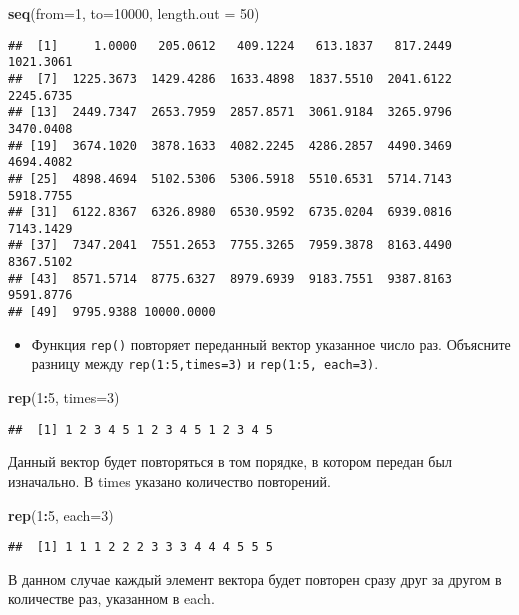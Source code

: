 \documentclass[]{article}
\newenvironment{Shaded}{\begin{snugshade}}{\end{snugshade}}
\newcommand{\KeywordTok}[1]{\textcolor[rgb]{0.13,0.29,0.53}{\textbf{#1}}}
\newcommand{\DataTypeTok}[1]{\textcolor[rgb]{0.13,0.29,0.53}{#1}}
\newcommand{\DecValTok}[1]{\textcolor[rgb]{0.00,0.00,0.81}{#1}}
\newcommand{\OperatorTok}[1]{\textcolor[rgb]{0.81,0.36,0.00}{\textbf{#1}}}
\newcommand{\NormalTok}[1]{#1}
\providecommand{\tightlist}{%
  \setlength{\itemsep}{0pt}\setlength{\parskip}{0pt}}
\begin{document}
\begin{Shaded}
\begin{Highlighting}[]
\KeywordTok{seq}\NormalTok{(}\DataTypeTok{from=}\DecValTok{1}\NormalTok{, }\DataTypeTok{to=}\DecValTok{10000}\NormalTok{, }\DataTypeTok{length.out =} \DecValTok{50}\NormalTok{)}
\end{Highlighting}
\end{Shaded}

\begin{verbatim}
##  [1]     1.0000   205.0612   409.1224   613.1837   817.2449  1021.3061
##  [7]  1225.3673  1429.4286  1633.4898  1837.5510  2041.6122  2245.6735
## [13]  2449.7347  2653.7959  2857.8571  3061.9184  3265.9796  3470.0408
## [19]  3674.1020  3878.1633  4082.2245  4286.2857  4490.3469  4694.4082
## [25]  4898.4694  5102.5306  5306.5918  5510.6531  5714.7143  5918.7755
## [31]  6122.8367  6326.8980  6530.9592  6735.0204  6939.0816  7143.1429
## [37]  7347.2041  7551.2653  7755.3265  7959.3878  8163.4490  8367.5102
## [43]  8571.5714  8775.6327  8979.6939  9183.7551  9387.8163  9591.8776
## [49]  9795.9388 10000.0000
\end{verbatim}

\begin{itemize}
\tightlist
\item
  Функция \texttt{rep()} повторяет переданный вектор указанное число
  раз. Объясните разницу между \texttt{rep(1:5,times=3)} и
  \texttt{rep(1:5,\ each=3)}.
\end{itemize}

\begin{Shaded}
\begin{Highlighting}[]
\KeywordTok{rep}\NormalTok{(}\DecValTok{1}\OperatorTok{:}\DecValTok{5}\NormalTok{, }\DataTypeTok{times=}\DecValTok{3}\NormalTok{)}
\end{Highlighting}
\end{Shaded}

\begin{verbatim}
##  [1] 1 2 3 4 5 1 2 3 4 5 1 2 3 4 5
\end{verbatim}

Данный вектор будет повторяться в том порядке, в котором передан был
изначально. В times указано количество повторений.

\begin{Shaded}
\begin{Highlighting}[]
\KeywordTok{rep}\NormalTok{(}\DecValTok{1}\OperatorTok{:}\DecValTok{5}\NormalTok{, }\DataTypeTok{each=}\DecValTok{3}\NormalTok{)}
\end{Highlighting}
\end{Shaded}

\begin{verbatim}
##  [1] 1 1 1 2 2 2 3 3 3 4 4 4 5 5 5
\end{verbatim}

В данном случае каждый элемент вектора будет повторен сразу друг за
другом в количестве раз, указанном в each.
\end{document}

